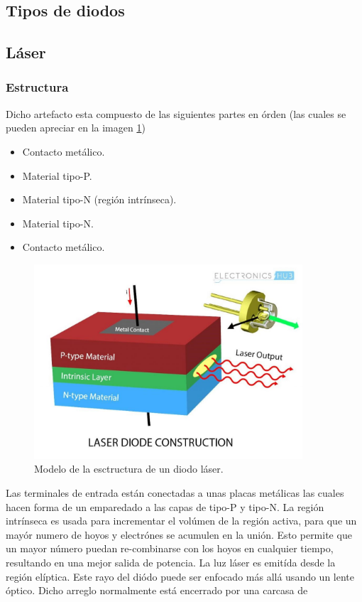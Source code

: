 \documentclass[letterpaper, 12pt]{article}
\begin{document}
    \newpage
    \begin{justify}
        \setcounter{page}{1}
        \thispagestyle{fancy}

        \section{Tipos de diodos}
        \subsection{Láser}
        \subsubsection{Estructura}
        Dicho artefacto esta compuesto de las siguientes partes en órden (las cuales se pueden apreciar en la imagen \ref{fig:laser})
        \begin{itemize}
            \item Contacto metálico.
            \item Material tipo-P.
            \item Material tipo-N (región intrínseca).
            \item Material tipo-N.
            \item Contacto metálico.
        \end{itemize}
        \begin{figure}[H]
            \centering
            \includegraphics[width=10cm]{laserd.jpg}
            \caption{Modelo de la esctructura de un diodo láser.}
            \label{fig:laser}
        \end{figure}
        Las terminales de entrada están conectadas a unas placas metálicas las cuales hacen forma de un emparedado a las capas de tipo-P y tipo-N. La región intrínseca es usada para incrementar el volúmen de la región activa, para que un mayór numero de hoyos y electrónes
        se acumulen en la unión. Esto permite que un mayor número puedan re-combinarse con los hoyos en cualquier tiempo, resultando en una mejor salida de potencia. La luz láser es emitída desde la región elíptica. Este rayo del diódo puede ser enfocado más allá usando un lente
        óptico. Dicho arreglo normalmente está encerrado por una carcasa de

\end{justify}
\end{document}
